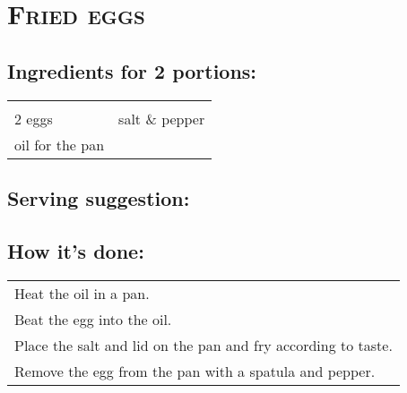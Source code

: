 \section{\textsc{Fried eggs}}

\subsection*{Ingredients for 2 portions:}

\begin{tabular}{p{7.5cm} p{7.5cm}}
	& \\
	2 eggs & salt \& pepper \\
	oil for the pan & 
\end{tabular}

\subsection*{Serving suggestion:}


\subsection*{How it's done:}

\begin{tabular}{p{15cm}}
	\\
	Heat the oil in a pan.\\
	Beat the egg into the oil.\\
	Place the salt and lid on the pan and fry according to taste.\\
	Remove the egg from the pan with a spatula and pepper.
\end{tabular}
